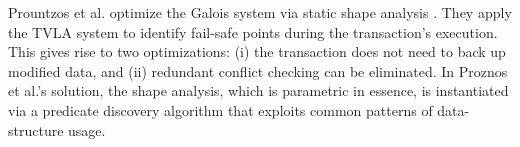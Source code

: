 	Prountzos et al. \cite{PrountzosMPM11} optimize the Galois system \cite{Galois} via static shape analysis \cite{MoolyToplas}. They apply the TVLA system to identify fail-safe points during the transaction's execution. This gives rise to two optimizations: (i) the transaction does not need to back up modified data, and (ii) redundant conflict checking can be eliminated. In Proznos et al.'s solution, the shape analysis, which is parametric in essence, is instantiated via a predicate discovery algorithm that exploits common patterns of data-structure usage.



